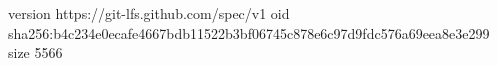 version https://git-lfs.github.com/spec/v1
oid sha256:b4c234e0ecafe4667bdb11522b3bf06745c878e6c97d9fdc576a69eea8e3e299
size 5566
